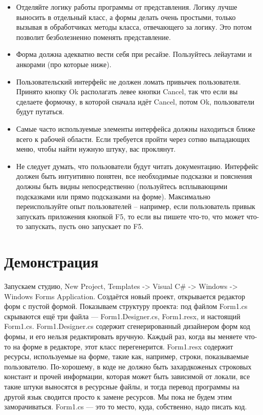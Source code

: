 \documentclass[a5paper]{article}
\begin{document}
\begin{itemize}
    \item Отделяйте логику работы программы от представления. Логику лучше выносить в отдельный класс, а формы делать очень простыми, только вызывая в обработчиках методы класса, отвечающего за логику. Это потом позволит безболезненно поменять представление.
    \item Форма должна адекватно вести себя при ресайзе. Пользуйтесь лейаутами и анкорами (про которые ниже).
    \item Пользовательский интерфейс не должен ломать привычек пользователя. Принято кнопку Ok располагать левее кнопки Cancel, так что если вы сделаете формочку, в которой сначала идёт Cancel, потом Ok, пользователи будут путаться. 
    \item Самые часто используемые элементы интерфейса должны находиться ближе всего к рабочей области. Если требуется пройти через сотню выпадающих меню, чтобы найти нужную штуку, вас проклянут.
    \item Не следует думать, что пользователи будут читать документацию. Интерфейс должен быть интуитивно понятен, все необходимые подсказки и пояснения должны быть видны непосредственно (пользуйтесь всплывающими подсказками или прямо подсказками на форме). Максимально переиспользуйте опыт пользователей – например, если пользователь привык запускать приложения кнопкой F5, то если вы пишете что-то, что может что-то запускать, пусть оно запускает по F5.
\end{itemize}

\section{Демонстрация}

Запускаем студию, New Project, Templates -> Visual C\# -> Windows -> Windows Forms Application. Создаётся новый проект, открывается редактор форм с пустой формой. Показываем структуру проекта: под файлом Form1.cs скрываются ещё три файла --- Form1.Designer.cs, Form1.resx, и настоящий Form1.cs. Form1.Designer.cs содержит сгенерированный дизайнером форм код формы, и его нельзя редактировать вручную. Каждый раз, когда вы меняете что-то на форме в редакторе, этот класс перегенерится. Form1.resx содержит ресурсы, используемые на форме, такие как, например, строки, показываемые пользователю. По-хорошему, в коде не должно быть захардкоженых строковых констант и прочей информации, которая может быть зависимой от локали, все такие штуки выносятся в ресурсные файлы, и тогда перевод программы на другой язык сводится просто к замене ресурсов. Мы пока не будем этим заморачиваться. Form1.cs --- это то место, куда, собственно, надо писать код.
\end{document}
